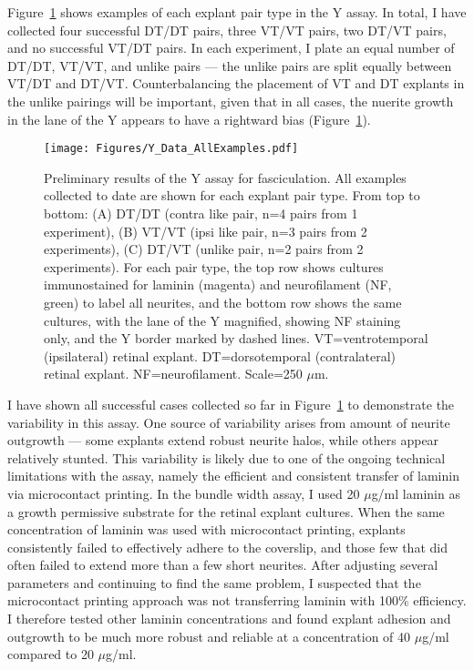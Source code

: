 Figure~\ref{Figures/YDataAllExamples} shows examples of each explant pair type in the Y assay.
In total, I have collected four successful DT/DT pairs, three VT/VT pairs, two DT/VT pairs, and no successful VT/DT pairs.
In each experiment, I plate an equal number of DT/DT, VT/VT, and unlike pairs --- the unlike pairs are split equally between VT/DT and DT/VT.
Counterbalancing the placement of VT and DT explants in the unlike pairings will be important, given that in all cases, the nuerite growth in the lane of the Y appears to have a rightward bias (Figure~\ref{Figures/YDataAllExamples}).
\begin{figure}[hbtp]
    \begin{center}
        \texttt{[image: Figures/Y\_Data\_AllExamples.pdf]}
        \caption[Preliminary results of the Y assay for fasciculation.]
        {Preliminary results of the Y assay for fasciculation.
        All examples collected to date are shown for each explant pair type.
        From top to bottom: (A) DT/DT (contra like pair, n=4 pairs from 1 experiment), (B) VT/VT (ipsi like pair, n=3 pairs from 2 experiments), (C) DT/VT (unlike pair, n=2 pairs from 2 experiments).
        For each pair type, the top row shows cultures immunostained for laminin (magenta) and neurofilament (NF, green) to label all neurites, and the bottom row shows the same cultures, with the lane of the Y magnified, showing NF staining only, and the Y border marked by dashed lines.
        VT=ventrotemporal (ipsilateral) retinal explant.
        DT=dorsotemporal (contralateral) retinal explant.
        NF=neurofilament.
        Scale=250 $\mu$m.
        }
        \label{Figures/YDataAllExamples}
    \end{center}
\end{figure}

I have shown all successful cases collected so far in Figure~\ref{Figures/YDataAllExamples} to demonstrate the variability in this assay.
One source of variability arises from amount of neurite outgrowth --- some explants extend robust neurite halos, while others appear relatively stunted.
This variability is likely due to one of the ongoing technical limitations with the assay, namely the efficient and consistent transfer of laminin via microcontact printing.
In the bundle width assay, I used 20 $\mu$g/ml laminin as a growth permissive substrate for the retinal explant cultures.
When the same concentration of laminin was used with microcontact printing, explants consistently failed to effectively adhere to the coverslip, and those few that did often failed to extend more than a few short neurites.
After adjusting several parameters and continuing to find the same problem, I suspected that the microcontact printing approach was not transferring laminin with 100\% efficiency.
I therefore tested other laminin concentrations and found explant adhesion and outgrowth to be much more robust and reliable at a concentration of 40 $\mu$g/ml compared to 20 $\mu$g/ml.

